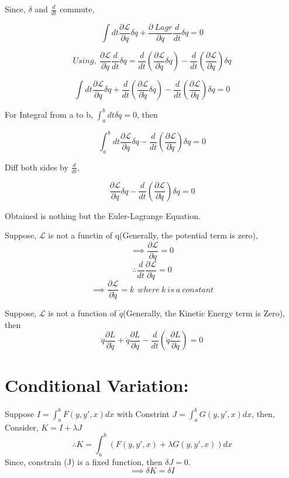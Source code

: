 \documentclass[a4paper]{article}
\newcommand{\Lagr}{\mathcal{L}}
\newcommand{\ddt}{\frac{d}{dt}}
\newcommand{\pdt}[2]{\frac{\partial #1}{\partial #2}}
\begin{document}
		Since, $\delta$ and $\frac{d}{dt}$ commute,

		$$ \int dt \frac{\partial\Lagr}{\partial q}\delta q + \frac{\partial\ Lagr}{\partial\dot{q}}\ddt\delta q = 0 $$

		$$Using,\ \frac{\partial\Lagr}{\partial \dot{q}}\frac{d}{dt}\delta q = \ddt(\frac{\partial\Lagr}{\partial\dot{q}}\delta q) - \ddt(\frac{\partial\Lagr}{\partial\dot{q}}) \delta q $$

		$$ \int dt \frac{\partial\Lagr}{\partial q}\delta q + \ddt(\frac{\partial\Lagr}{\partial\dot{q}}\delta q) - \ddt(\frac{\partial\Lagr}{\partial\dot{q}}) \delta q = 0 $$

		For Integral from a to b, $\int_a^b dt \delta q = 0$, then

		$$ \int_a^b dt \frac{\partial\Lagr}{\partial q}\delta q - \ddt(\frac{\partial\Lagr}{\partial\dot{q}}) \delta q = 0 $$
		
		Diff both sides by $\ddt$,

		\begin{equation}
			\frac{\partial\Lagr}{\partial q}\delta q - \ddt(\frac{\partial\Lagr}{\partial\dot{q}}) \delta q = 0 \label{eq_E-L}
		\end{equation}

		Obtained is nothing but the Euler-Lagrange Equation.
		
		Suppose, $\Lagr$ is not a functin of q(Generally, the potential term is zero), 
		$$\implies \frac{\partial\Lagr}{\partial q} = 0 $$
		$$\therefore \ddt\frac{\partial\Lagr}{\partial \dot{q}} = 0 $$
		$$\implies \frac{\partial\Lagr}{\partial \dot{q}} = k\ \ where\ k\ is\ a\ constant$$ 

		Suppose, $\Lagr$ is not a function of $\dot{q}$(Generally, the Kinetic Energy term is Zero), then
		$$ \ddot{q}\pdt{L}{\dot{q}} + \dot{q}\pdt{L}{q} - \ddt(\dot{q}\pdt{L}{\dot{q}}) = 0$$

	\section*{Conditional Variation: }
		
		\noindent

		Suppose $ I = \int_a^b F(y, y', x) dx $ with Constrint $ J = \int_a^b G(y, y', x) dx $, then, \hfill \\

		Consider, $ K = I + \lambda J $
		$$\therefore K = \int_a^b (F(y, y', x) + \lambda G(y, y', x)) dx $$
		Since, constrain (J) is a fixed function, then $\delta J =0 $.
		$$\implies \delta K = \delta I $$
\end{document}
